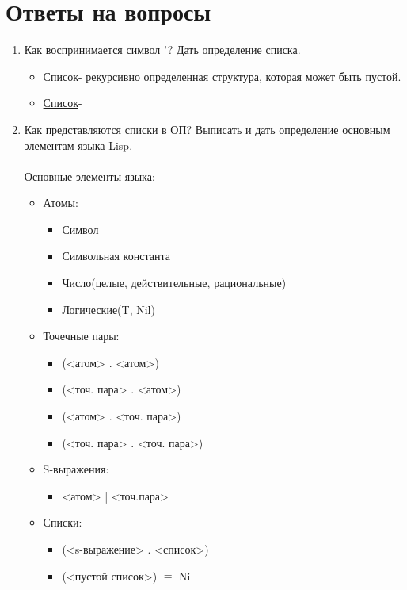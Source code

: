 \newpage
\section*{Ответы на вопросы}
\begin{enumerate}
  \item\Large{Как воспринимается символ '? Дать определение списка.}
    \begin{itemize}
      \item \underline{Список}- рекурсивно определенная структура, которая может быть пустой.
      \item \underline{Список}- 
    \end{itemize}
  \item\Large{Как представляются списки в ОП? Выписать и дать определение основным элементам языка Lisp.}\\
  \\
    \underline{Основные элементы языка:}
    \begin{itemize}
      \item Атомы:
      \begin{itemize}
          \item Символ
          \item Символьная константа
	  \item Число(целые, действительные, рациональные)
	  \item Логические(T, Nil)
      \end{itemize}
      \item Точечные пары:
      \begin{itemize}
      	   \item (<атом> . <атом>)
	   \item (<точ. пара> . <атом>)
	   \item (<атом> . <точ. пара>)
	   \item (<точ. пара> . <точ. пара>)
      \end{itemize}
      \item S-выражения:
      \begin{itemize}
      	   \item <атом> | <точ.пара>
      \end{itemize}
      \item Списки:
      \begin{itemize}
      	   \item (<s-выражение> . <список>)
	   \item (<пустой список>) $\equiv$ Nil
      \end{itemize}
    \end{itemize}
\end{enumerate}


